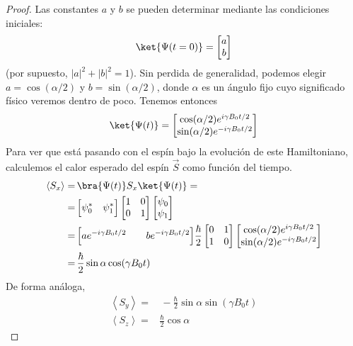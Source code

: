 \documentclass[a4paper,11pt]{book} %
\numberwithin{equation}{chapter}
\def\Lc{\Bigl[}
\def\Rc{\Bigr]}
\begin{document}
\begin{proof}
Las constantes $a$ y $b$ se pueden determinar mediante las condiciones iniciales:
	\begin{equation}
	\ket{\Psi (t = 0)} = \begin{bmatrix} a \\ b	\end{bmatrix}
	\end{equation}
(por supuesto, $|a|^2 + |b|^2 = 1$). Sin perdida de generalidad, podemos elegir $a = \cos (\alpha/2)$ y $b = \sin (\alpha/2)$, donde $\alpha$ es un ángulo fijo cuyo significado físico veremos dentro de poco.
Tenemos entonces
	\begin{equation}
	\ket{\Psi (t)} = 
	\begin{bmatrix} 
	\cos (\alpha/2) e^{i \gamma B_0 t/2} \\ 
	\sin (\alpha/2) e^{-i \gamma B_0 t/2} 
	\end{bmatrix}
	\end{equation}
Para ver que está pasando con el espín bajo la evolución de este Hamiltoniano, calculemos el calor esperado del espín $\vec{S}$ como función del tiempo.
	\begin{align}
	\left\langle S_x \right\rangle = & \, \bra{\Psi(t)} S_x \ket{\Psi(t)} = 
	\nonumber \\
	= & \, \Lc \psi_0^* \quad \psi_1^* \Rc 
	\begin{bmatrix} 1 & 0 \\ 0 & 1 \end{bmatrix}  
	\begin{bmatrix} \psi_0 \\ \psi_1 \end{bmatrix} 
	\nonumber \\
	= & \, \Lc a e ^{-i \gamma B_0 t/2} \qquad  b e ^{-i \gamma B_0 t/2} \Rc 
	\frac{\hbar}{2} \begin{bmatrix} 0 & 1 \\ 1 & 0 \end{bmatrix} 
	\begin{bmatrix} \cos (\alpha/2) e^{i \gamma B_0 t/2} \\	\sin (\alpha/2) e^{-i \gamma B_0 t/2} \end{bmatrix} 
	\nonumber \\
	= & \, \frac{\hbar}{2} \sin \alpha \cos (\gamma B_0 t ) 
	\end{align}
De forma análoga,
	\begin{align}
	\left\langle S_y \right\rangle = & \, - \frac{\hbar}{2} \sin \alpha \sin (\gamma B_0 t )  \\
	\left\langle S_z \right\rangle = & \frac{\hbar}{2} \cos \alpha
	\end{align}


\end{proof}
\end{document}
